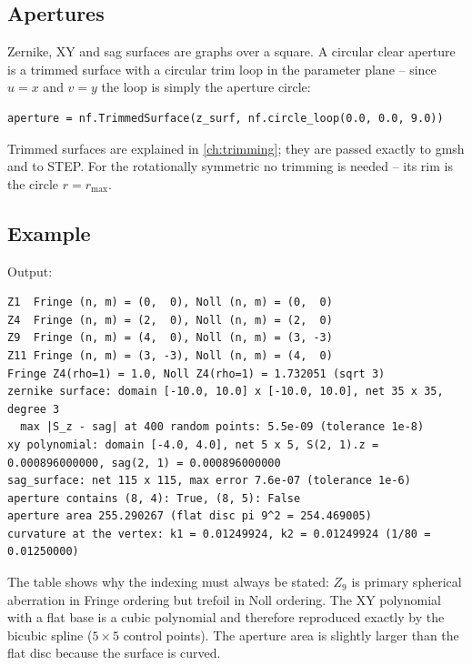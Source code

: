\subsection{Apertures}

Zernike, XY and sag surfaces are graphs over a square. A circular clear aperture is a trimmed
surface with a circular trim loop in the parameter plane -- since $u = x$ and $v = y$ the loop
is simply the aperture circle:

\begin{lstlisting}
aperture = nf.TrimmedSurface(z_surf, nf.circle_loop(0.0, 0.0, 9.0))
\end{lstlisting}

Trimmed surfaces are explained in \cref{ch:trimming}; they are passed exactly to gmsh and to
STEP. For the rotationally symmetric  no trimming is needed -- its rim is
the circle $r = r_\text{max}$.

\subsection{Example}


Output:

\begin{lstlisting}[style=text]
Z1  Fringe (n, m) = (0,  0), Noll (n, m) = (0,  0)
Z4  Fringe (n, m) = (2,  0), Noll (n, m) = (2,  0)
Z9  Fringe (n, m) = (4,  0), Noll (n, m) = (3, -3)
Z11 Fringe (n, m) = (3, -3), Noll (n, m) = (4,  0)
Fringe Z4(rho=1) = 1.0, Noll Z4(rho=1) = 1.732051 (sqrt 3)
zernike surface: domain [-10.0, 10.0] x [-10.0, 10.0], net 35 x 35, degree 3
  max |S_z - sag| at 400 random points: 5.5e-09 (tolerance 1e-8)
xy polynomial: domain [-4.0, 4.0], net 5 x 5, S(2, 1).z = 0.000896000000, sag(2, 1) = 0.000896000000
sag_surface: net 115 x 115, max error 7.6e-07 (tolerance 1e-6)
aperture contains (8, 4): True, (8, 5): False
aperture area 255.290267 (flat disc pi 9^2 = 254.469005)
curvature at the vertex: k1 = 0.01249924, k2 = 0.01249924 (1/80 = 0.01250000)
\end{lstlisting}

The table shows why the indexing must always be stated: $Z_9$ is primary spherical aberration in
Fringe ordering but trefoil in Noll ordering. The XY polynomial with a flat base is a cubic
polynomial and therefore reproduced exactly by the bicubic spline ($5\times5$ control points).
The aperture area is slightly larger than the flat disc because the surface is curved.

